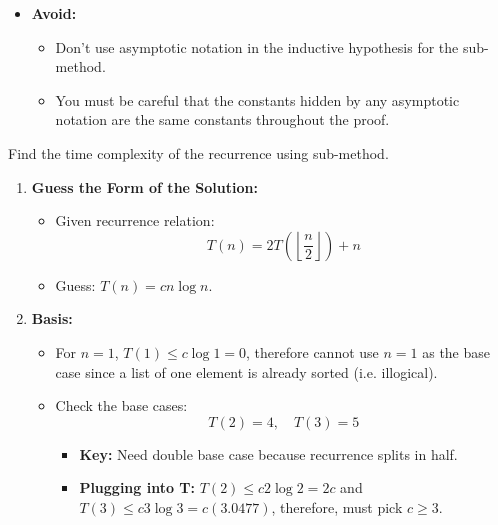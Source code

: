     \begin{intuition}
        \begin{itemize}
            \item \textbf{Avoid:} 
            \begin{itemize}
                \item Don't use asymptotic notation in the inductive hypothesis for the sub-method.
                \item You must be careful that the constants hidden by any asymptotic notation are the same constants throughout the proof.
            \end{itemize}
        \end{itemize}
    \end{intuition}

    \begin{example}
        Find the time complexity of the recurrence using sub-method. 
        \begin{enumerate}
            \item \textbf{Guess the Form of the Solution:}
            \begin{itemize}
                \item Given recurrence relation:
                \[
                T(n) = 2T\left(\left\lfloor \frac{n}{2} \right\rfloor\right) + n
                \]
                \item Guess: \( T(n) = cn \log n \).
            \end{itemize}
        
            \item \textbf{Basis:}
            \begin{itemize}
                \item For $n=1$, $T(1) \leq c \log 1 = 0$, therefore cannot use $n=1$ as the base case since a list of one element is already sorted (i.e. illogical).
                \item Check the base cases:
                \[
                T(2) = 4, \quad T(3) = 5
                \]
                \begin{itemize}
                    \item \textbf{Key:} Need double base case because recurrence splits in half. 
                    \item \textbf{Plugging into T:} $T(2) \leq c 2 \log 2 = 2c$ and $T(3) \leq c 3 \log 3 = c(3.0477)$, therefore, must pick $c \geq 3$.
                \end{itemize}
            \end{itemize}
            

\end{enumerate}
\end{example}
